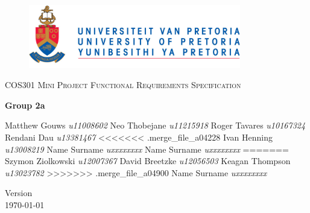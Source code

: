 \begin{titlepage}
	\begin{center}
		
		\begin{figure}[t]
			\centering
			\includegraphics[width=350px]{UP_Logo.png}
		\end{figure}
		
		\textsc{\LARGE COS301 Mini Project Functional \newline\newline Requirements Specification}
		
		\textbf{\newline Group 2a} \\
		\begin{flushright} \large
			Matthew Gouws \emph{u11008602} \newline
			Neo Thobejane \emph{u11215918} \newline
			Roger Tavares \emph{u10167324} \newline
			Rendani Dau \emph{u13381467} \newline
<<<<<<< .merge_file_a04228
			Ivan Henning \emph{u13008219} \newline
			Name Surname \emph{uxxxxxxxx} \newline
			Name Surname \emph{uxxxxxxxx} \newline
=======
			Szymon Ziolkowski \emph{u12007367} \newline
			David Breetzke  \emph{u12056503} \newline
			Keagan Thompson \emph{u13023782} \newline
>>>>>>> .merge_file_a04900
			Name Surname \emph{uxxxxxxxx} \newline
		\end{flushright}
		
		\vfill
		
		{\large Version }
		\\
		{\large \today}
		
	\end{center}
\end{titlepage}
